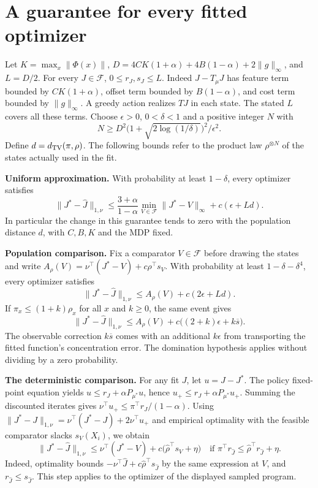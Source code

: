 \documentclass[12pt,a4paper]{article}
\newcommand{\cF}{\mathcal F}
\newcommand{\TV}{d_{\rm TV}}
\newcommand{\ep}{\epsilon}
\newcommand{\al}{\alpha}
\newcommand{\lead}[1]{\par\smallskip\noindent\textbf{#1}\enspace}
\begin{document}
\newpage
\section*{A guarantee for every fitted optimizer}
Let $K=\max_x\|\Phi(x)\|$, $D=4CK(1+\al)+4B(1-\al)+2\|g\|_\infty$,
and $L=D/2$. For every $J\in\cF$, $0\le r_J,s_J\le L$.
Indeed $J-T_\mu J$ has feature term bounded by $CK(1+\al)$, offset
term bounded by $B(1-\al)$, and cost term bounded by $\|g\|_\infty$.
A greedy action realizes $TJ$ in each state. The stated $L$ covers all
these terms. Choose $\ep>0$, $0<\delta<1$ and a positive integer $N$ with
\[
 N\ge D^2\bigl(1+\sqrt{2\log(1/\delta)}\bigr)^2/\ep^2 .
\]
Define $d=\TV(\pi,\rho)$. The following bounds refer to the product law
$\rho^{\otimes N}$ of the states actually used in the fit.

\lead{Uniform approximation.}
With probability at least $1-\delta$, every optimizer satisfies
\begin{equation}
 \|J^*-\widehat J\|_{1,\nu}\le
 \frac{3+\al}{1-\al}\min_{V\in\cF}\|J^*-V\|_\infty
       +c(\ep+Ld).
 \label{eq:best}
\end{equation}
In particular the change in this guarantee tends to zero with the
population distance $d$, with $C,B,K$ and the MDP fixed.

\lead{Population comparison.}
Fix a comparator $V\in\cF$ before drawing the states and write
$A_\rho(V)=\nu^\top(J^*-V)+c\rho^\top s_V$. With probability at least
$1-\delta-\delta^4$, every optimizer satisfies
\begin{equation}
 \|J^*-\widehat J\|_{1,\nu}\le A_\rho(V)+c(2\ep+Ld).
 \label{eq:fixed}
\end{equation}
If $\pi_x\le(1+k)\rho_x$ for all $x$ and $k\ge0$, the same event gives
\begin{equation}
 \|J^*-\widehat J\|_{1,\nu}\le
 A_\rho(V)+c\bigl((2+k)\ep+k\overline s\bigr).
 \label{eq:ratio}
\end{equation}
The observable correction $k\overline s$ comes with an additional
$k\ep$ from transporting the fitted function's concentration error.
The domination hypothesis applies without dividing by a zero probability.

\lead{The deterministic comparison.}
For any fit $J$, let $u=J-J^*$. The policy fixed-point equation yields
$u\le r_J+\al P_{\mu^*}u$, hence
$u_+\le r_J+\al P_{\mu^*}u_+$. Summing the discounted iterates gives
$\nu^\top u_+\le\pi^\top r_J/(1-\al)$. Using
$\|J^*-J\|_{1,\nu}=\nu^\top(J^*-J)+2\nu^\top u_+$ and empirical
optimality with the feasible comparator slacks $s_V(X_i)$, we obtain
\begin{equation}
 \|J^*-\widehat J\|_{1,\nu}\le
 \nu^\top(J^*-V)+c\bigl(\widehat\rho^\top s_V+\eta\bigr)
 \quad\text{if }\pi^\top r_{\widehat J}\le\widehat\rho^\top r_{\widehat J}+\eta .
 \label{eq:path}
\end{equation}
Indeed, optimality bounds $-\nu^\top\widehat J+c\widehat\rho^\top
s_{\widehat J}$ by the same expression at $V$, and $r_{\widehat J}\le
s_{\widehat J}$. This step applies to the optimizer of the displayed sampled program.
\end{document}
